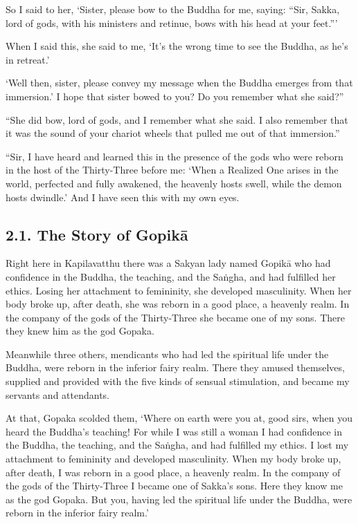 \documentclass[12pt,openany]{book}%
\begin{document}
So I said to her, ‘Sister, please bow to the Buddha for me, saying: “Sir, Sakka, lord of gods, with his ministers and retinue, bows with his head at your feet.”’ 

When I said this, she said to me, ‘It’s the wrong time to see the Buddha, as he’s in retreat.’ 

‘Well then, sister, please convey my message when the Buddha emerges from that immersion.’ I hope that sister bowed to you? Do you remember what she said?” 

“She did bow, lord of gods, and I remember what she said. I also remember that it was the sound of your chariot wheels that pulled me out of that immersion.” 

“Sir, I have heard and learned this in the presence of the gods who were reborn in the host of the Thirty-Three before me: ‘When a Realized One arises in the world, perfected and fully awakened, the heavenly hosts swell, while the demon hosts dwindle.’ And I have seen this with my own eyes. 

\subsection*{2.1. The Story of \textsanskrit{Gopikā} }

Right here in Kapilavatthu there was a Sakyan lady named \textsanskrit{Gopikā} who had confidence in the Buddha, the teaching, and the \textsanskrit{Saṅgha}, and had fulfilled her ethics. Losing her attachment to femininity, she developed masculinity. When her body broke up, after death, she was reborn in a good place, a heavenly realm. In the company of the gods of the Thirty-Three she became one of my sons. There they knew him as the god Gopaka. 

Meanwhile three others, mendicants who had led the spiritual life under the Buddha, were reborn in the inferior fairy realm. There they amused themselves, supplied and provided with the five kinds of sensual stimulation, and became my servants and attendants. 

At that, Gopaka scolded them, ‘Where on earth were you at, good sirs, when you heard the Buddha’s teaching! For while I was still a woman I had confidence in the Buddha, the teaching, and the \textsanskrit{Saṅgha}, and had fulfilled my ethics. I lost my attachment to femininity and developed masculinity. When my body broke up, after death, I was reborn in a good place, a heavenly realm. In the company of the gods of the Thirty-Three I became one of Sakka’s sons. Here they know me as the god Gopaka. But you, having led the spiritual life under the Buddha, were reborn in the inferior fairy realm.’ 
\end{document}
